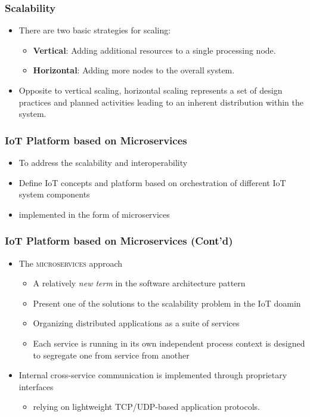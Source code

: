 \documentclass{../iot-lecture}
\begin{document}
\begin{frame}
  \frametitle{Scalability}
  \begin{itemize}
    \item There are two basic strategies for scaling:
    \begin{itemize}
      \item \textbf{\color{RubineRed} Vertical}: Adding additional resources to a single processing node.
      \item \textbf{\color{Cyan} Horizontal}: Adding more nodes to the overall system.
    \end{itemize}
    \item Opposite to vertical scaling, horizontal scaling represents a set of design practices and
      planned activities leading to an inherent distribution within the system.
  \end{itemize}
\end{frame}

\begin{frame}
  \frametitle{IoT Platform based on Microservices}
  \begin{itemize}
    \item To address the scalability and interoperability
    \item Define IoT concepts and platform based on orchestration of different IoT system components
    \item implemented in the form of microservices
  \end{itemize}
\end{frame}

\begin{frame}
  \frametitle{IoT Platform based on Microservices (Cont'd)}
  \begin{itemize}
    \item The \textsc{\color{YellowOrange} microservices} approach
    \begin{itemize}
      \item A relatively \textit{\color{LimeGreen} new term} in the software architecture pattern
      \item Present one of the solutions to the scalability problem in the IoT doamin
      \item Organizing distributed applications as a suite of services
      \item Each service is running in its own independent process context
        is designed to segregate one from service from another
    \end{itemize}
    \item Internal cross-service communication is implemented through proprietary interfaces
    \begin{itemize}
      \item relying on lightweight TCP/UDP-based application protocols.
    \end{itemize}
  \end{itemize}
\end{frame}
\end{document}

